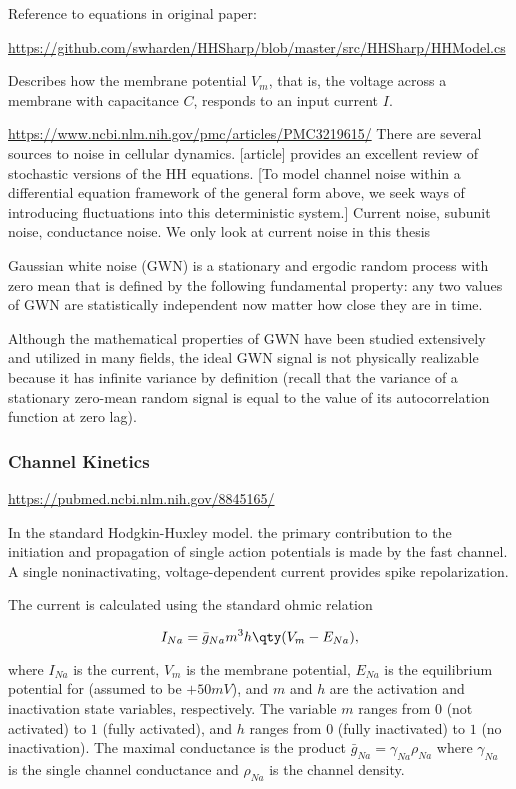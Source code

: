 Reference to equations in original paper: 

\url{https://github.com/swharden/HHSharp/blob/master/src/HHSharp/HHModel.cs}

Describes how the membrane potential $V_m$, that is, the voltage across a membrane with capacitance $C$, responds to an input current $I$.


\url{https://www.ncbi.nlm.nih.gov/pmc/articles/PMC3219615/}
There are several sources to noise in cellular dynamics. [article] provides an excellent review of stochastic versions of the HH equations. [To model channel noise within a differential equation framework of the general form above, we seek ways of introducing fluctuations into this deterministic system.] Current noise, subunit noise, conductance noise. We only look at current noise in this thesis

Gaussian white noise (GWN) is a stationary and ergodic random process with zero mean that is defined by the following fundamental property: any two values of GWN are statistically independent now matter how close they are in time. 

Although the mathematical properties of GWN have been studied extensively and utilized in many fields, the ideal GWN signal is not physically realizable because it has infinite variance by definition (recall that the variance of a stationary zero-mean random signal is equal to the value of its autocorrelation function at zero lag).


\subsubsection{Channel Kinetics}

\url{https://pubmed.ncbi.nlm.nih.gov/8845165/}

In the standard Hodgkin-Huxley model. the primary contribution to the initiation and propagation of single action potentials is made by the fast \Na channel. A single noninactivating, voltage-dependent \K current provides spike repolarization. 

The \Na current is calculated using the standard ohmic relation

\begin{equation*}
    I_{Na} = \bar{g}_{Na} m^3 h \qty(V_m - E_{Na}),
\end{equation*}

where $I_{Na}$ is the \Na current, $V_m$ is the membrane potential, $E_{Na}$ is the equilibrium potential for \Na (assumed to be $+50 mV$), and $m$ and $h$ are the activation and inactivation state variables, respectively. The variable $m$ ranges from $0$ (not activated) to $1$ (fully activated), and $h$ ranges from $0$ (fully inactivated) to $1$ (no inactivation). The maximal conductance is the product $\bar{g}_{Na} = \gamma_{Na} \rho_{Na}$ where $\gamma_{Na}$ is the single channel conductance and $\rho_{Na}$ is the channel density. 

